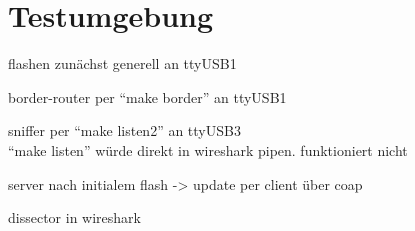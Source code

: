\section{Testumgebung}

flashen zunächst generell an ttyUSB1

border-router per "`make border"' an ttyUSB1

sniffer per "`make listen2"' an ttyUSB3\\
"`make listen"' würde direkt in wireshark pipen. funktioniert nicht

server nach initialem flash -> update per client über coap

dissector in wireshark